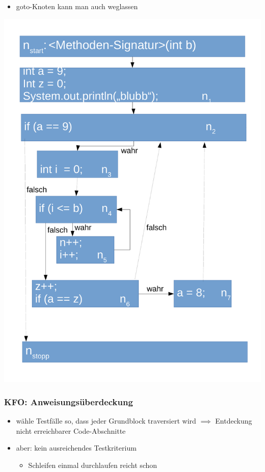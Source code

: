 \documentclass[18pt]{beamer}
\begin{document}
	\begin{frame}
		\begin{itemize}
			\item goto-Knoten kann man auch weglassen
		\end{itemize}
		\centering \includegraphics[scale=0.27]{./pics/tut5/kfo-no-goto.pdf}
	\end{frame}

	\begin{frame}
		\frametitle{KFO: Anweisungsüberdeckung}
		\begin{itemize}
			\item wähle Testfälle so, dass jeder Grundblock traversiert wird \pause
			\linebreak $\implies$ Entdeckung nicht erreichbarer Code-Abschnitte \pause
			\item aber: kein ausreichendes Testkriterium
			\begin{itemize}
				\item Schleifen einmal durchlaufen reicht schon
			\end{itemize}
		\end{itemize}
	\end{frame}
\end{document}
